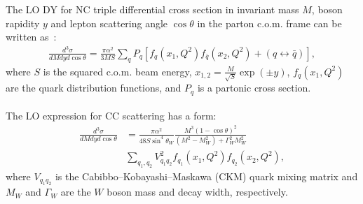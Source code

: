 
The LO DY for NC triple differential cross section in invariant mass \(M\), boson rapidity \(y\) 
and lepton scattering angle \(\cos\theta\) in the parton c.o.m. frame can be written as~\cite{Drell:1970wh,Yamada:1981mw}:
\begin{align}
 \textstyle
 \frac{d^3\sigma}{dM{d}y d\cos\theta} =  
 \frac{\pi\alpha^2}{3MS}\sum_{q}P_q \left[f_q(x_1,Q^2)f_{\bar{q}}(x_2,Q^2) 
 + (q\leftrightarrow\bar{q})\right],
\end{align}
where \(S\) is the squared c.o.m. beam energy, \(x_{1,2} = \frac{M}{\sqrt{S}}\exp(\pm y)\), $f_q(x_1,Q^2)$ 
are the quark distribution functions, and 
$P_q$ is a partonic cross section. 
%
\\
\\
The LO expression for CC  scattering has a form:
\begin{align}
\frac{d^3\sigma}{dMdyd\cos\theta} &=
 \frac{\pi\alpha^2}{48S\sin^4\theta_W}
 \frac{M^3(1-\cos\theta)^2}{(M^2-M_W^2)+\Gamma_W^2M_W^2}  \nonumber \\
 & \sum_{q_1,q_2}V_{q_1q_2}^2f_{q_1}(x_1,Q^2)f_{q_2}(x_2,Q^2),
\end{align}
where \(V_{q_1q_2}\) is the Cabibbo–Kobayashi–Maskawa (CKM) quark mixing matrix and \(M_W\) and \(\Gamma_W\)
are the \(W\) boson mass and decay width, respectively.

